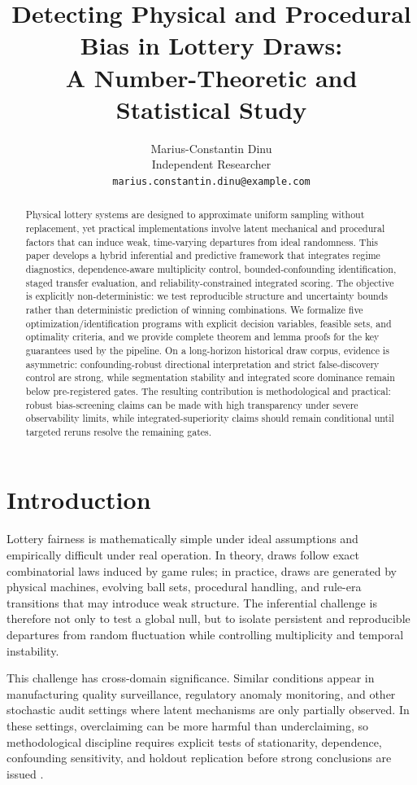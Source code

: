 \documentclass{article} %
\title{Detecting Physical and Procedural Bias in Lottery Draws: \\
A Number-Theoretic and Statistical Study}
\author{Marius-Constantin Dinu \\
Independent Researcher \\
\texttt{marius.constantin.dinu@example.com}}
\begin{document}
\maketitle

\begin{abstract}
Physical lottery systems are designed to approximate uniform sampling without replacement, yet practical implementations involve latent mechanical and procedural factors that can induce weak, time-varying departures from ideal randomness. This paper develops a hybrid inferential and predictive framework that integrates regime diagnostics, dependence-aware multiplicity control, bounded-confounding identification, staged transfer evaluation, and reliability-constrained integrated scoring. The objective is explicitly non-deterministic: we test reproducible structure and uncertainty bounds rather than deterministic prediction of winning combinations. We formalize five optimization/identification programs with explicit decision variables, feasible sets, and optimality criteria, and we provide complete theorem and lemma proofs for the key guarantees used by the pipeline. On a long-horizon historical draw corpus, evidence is asymmetric: confounding-robust directional interpretation and strict false-discovery control are strong, while segmentation stability and integrated score dominance remain below pre-registered gates. The resulting contribution is methodological and practical: robust bias-screening claims can be made with high transparency under severe observability limits, while integrated-superiority claims should remain conditional until targeted reruns resolve the remaining gates.
\end{abstract}

\section{Introduction}
Lottery fairness is mathematically simple under ideal assumptions and empirically difficult under real operation. In theory, draws follow exact combinatorial laws induced by game rules; in practice, draws are generated by physical machines, evolving ball sets, procedural handling, and rule-era transitions that may introduce weak structure. The inferential challenge is therefore not only to test a global null, but to isolate persistent and reproducible departures from random fluctuation while controlling multiplicity and temporal instability.

This challenge has cross-domain significance. Similar conditions appear in manufacturing quality surveillance, regulatory anomaly monitoring, and other stochastic audit settings where latent mechanisms are only partially observed. In these settings, overclaiming can be more harmful than underclaiming, so methodological discipline requires explicit tests of stationarity, dependence, confounding sensitivity, and holdout replication before strong conclusions are issued \citep{S20,S21,S24,S32,S33}.
\end{document}
